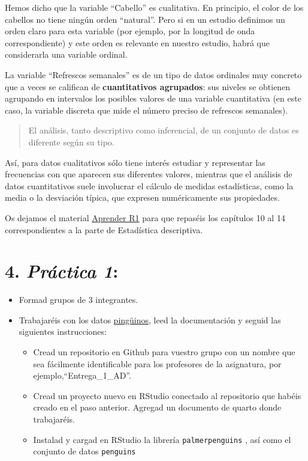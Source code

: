 \documentclass[
  letterpaper,
  DIV=11,
  numbers=noendperiod]{scrreprt}
\begin{document}

Hemos dicho que la variable ``Cabello'' es cualitativa. En principio, el
color de los cabellos no tiene ningún orden ``natural''. Pero si en un
estudio definimos un orden claro para esta variable (por ejemplo, por la
longitud de onda correspondiente) y este orden es relevante en nuestro
estudio, habrá que considerarla una variable ordinal.


La variable ``Refrescos semanales'' es de un tipo de datos ordinales muy
concreto que a veces se califican de \textbf{cuantitativos agrupados}:
sus niveles se obtienen agrupando en intervalos los posibles valores de
una variable cuantitativa (en este caso, la variable discreta que mide
el número preciso de refrescos semanales). 

\begin{quote}
El análisis, tanto descriptivo como inferencial, de un conjunto de datos
es diferente según su tipo.
\end{quote}

Así, para datos cualitativos sólo tiene interés estudiar y representar
las frecuencias con que aparecen sus diferentes valores, mientras que el
análisis de datos cuantitativos suele involucrar el cálculo de medidas
estadísticas, como la media o la desviación típica, que expresen
numéricamente sus propiedades.

Os dejamos el material
\href{https://aprender-uib.github.io/AprendeR1/}{Aprender R1} para que
repaséis los capítulos 10 al 14 correspondientes a la parte de
Estadística descriptiva.

\hypertarget{pruxe1ctica-1}{%
\section{\texorpdfstring{4. {\emph{Práctica
1}}:}{4. Práctica 1:}}\label{pruxe1ctica-1}}

\begin{itemize}
\item
  Formad grupos de 3 integrantes.
\item
  Trabajaréis con los datos
  \href{https://allisonhorst.github.io/palmerpenguins/}{pingüinos}, leed
  la documentación y seguid las siguientes instrucciones:

  \begin{itemize}
  \item
    Cread un repositorio en Github para vuestro grupo con un nombre que
    sea fácilmente identificable para los profesores de la asignatura,
    por ejemplo,``Entrega\_1\_AD''.
  \item
    Cread un proyecto nuevo en RStudio conectado al repositorio que
    habéis creado en el paso anterior. Agregad un documento de quarto
    donde trabajaréis.
  \item
    Instalad y cargad en RStudio la librería \texttt{palmerpenguins} ,
    así como el conjunto de datos \texttt{penguins}
  \end{itemize}
\end{itemize}
\end{document}
